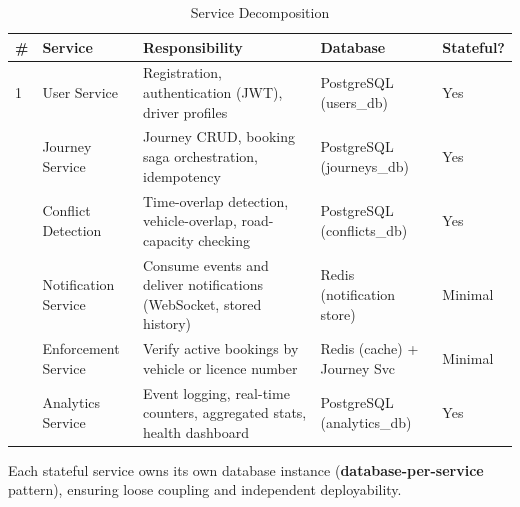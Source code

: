 \documentclass[12pt,a4paper]{article}
\begin{document}
\begin{table}[H]
\centering
\small

\begin{tabularx}{\textwidth}{C{0.4cm} L{3cm} X L{2.8cm} C{1.4cm}}
  \toprule
  \textbf{\#} & \textbf{Service} & \textbf{Responsibility} & \textbf{Database} & \textbf{Stateful?} \\
   & User Service        & Registration, authentication (JWT), driver profiles & PostgreSQL (users\_db) & Yes \\
   & Journey Service     & Journey CRUD, booking saga orchestration, idempotency & PostgreSQL (journeys\_db) & Yes \\
   & Conflict Detection  & Time-overlap detection, vehicle-overlap, road-capacity checking & PostgreSQL (conflicts\_db) & Yes \\
   & Notification Service& Consume events and deliver notifications (WebSocket, stored history) & Redis (notification store) & Minimal \\
   & Enforcement Service & Verify active bookings by vehicle or licence number & Redis (cache) + Journey Svc & Minimal \\
   & Analytics Service   & Event logging, real-time counters, aggregated stats, health dashboard & PostgreSQL (analytics\_db) & Yes \\
  \bottomrule
\end{tabularx}
\caption{Service Decomposition}
\end{table}

Each stateful service owns its own database instance (\textbf{database-per-service} pattern), ensuring loose coupling and independent deployability.



\end{document}
